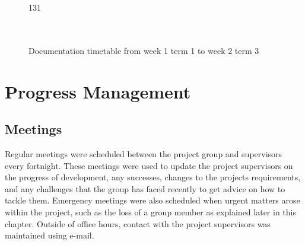 	\begin{sidewaysfigure}
	    \centering
	    \begin{ganttchart}[
			x unit=5.25mm,
			hgrid,
			vgrid,
			newline shortcut=true,
			time slot format=simple,
			bar/.append style={fill=Aquamarine!25},
			bar label node/.append style={align=right},
			milestone inline label node/.append style={right=3mm},
			milestone/.append style={fill=RubineRed!50},
			today=30,
			today rule/.style= {red, ultra thick, dashed},
			today label={Product delivery},
			link bulge=.5,
			link/.append style={thick}
		]{1}{31}
			 \\
			 \\
			 \\
			  \ganttnewline
			  \ganttnewline
	    \end{ganttchart}
	    \caption{Documentation timetable from week 1 term 1 to week 2 term 3}
	    \label{fig:document_timetable}
	\end{sidewaysfigure}
		
\section{Progress Management}
\label{sec:progress_management}

    \subsection{Meetings}
    
        Regular meetings were scheduled between the project group and supervisors every fortnight. These meetings were used to update the project supervisors on the progress of development, any successes, changes to the projects requirements, and any challenges that the group has faced recently to get advice on how to tackle them. Emergency meetings were also scheduled when urgent matters arose within the project, such as the loss of a group member as explained later in this chapter. Outside of office hours, contact with the project supervisors was maintained using e-mail.
        

